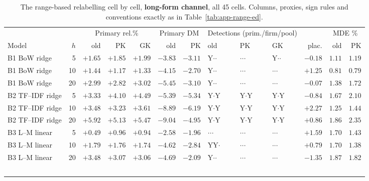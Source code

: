 \begin{table}[p]
\centering
\caption[The range-based relabelling, long-form cells]{The range-based
relabelling cell by cell, \textbf{long-form channel}, all 45 cells.
Columns, proxies, sign rules and conventions exactly as in
Table~\ref{tab:app-range-ed}.}
\label{tab:app-range-lf}
\singlespacing\footnotesize
\setlength{\tabcolsep}{3pt}
\begin{tabular}{@{}lrrrrrrlllrrr@{}}
\toprule
& & \multicolumn{3}{c}{Primary rel.\%} & \multicolumn{2}{c}{Primary DM} & \multicolumn{3}{c}{Detections (prim./firm/pool)} & & \multicolumn{2}{c}{MDE \%} \\
\cmidrule(lr){3-5}\cmidrule(lr){6-7}\cmidrule(lr){8-10}\cmidrule(lr){12-13}
Model & $h$ & old & PK & GK & old & PK & old & PK & GK & plac. & old & PK \\
\midrule
B1 BoW ridge & 5 & $+1.65$ & $+1.85$ & $+1.99$ & $-3.83$ & $-3.11$ & Y$\cdot$$\cdot$ & $\cdot$$\cdot$$\cdot$ & Y$\cdot$$\cdot$ & $-0.18$ & $1.11$ & $1.19$ \\
B1 BoW ridge & 10 & $+1.44$ & $+1.17$ & $+1.33$ & $-4.15$ & $-2.70$ & Y$\cdot$$\cdot$ & $\cdot$$\cdot$$\cdot$ & $\cdot$$\cdot$$\cdot$ & $+1.25$ & $0.81$ & $0.79$ \\
B1 BoW ridge & 20 & $+2.99$ & $+2.82$ & $+3.02$ & $-5.45$ & $-3.10$ & Y$\cdot$$\cdot$ & $\cdot$$\cdot$$\cdot$ & $\cdot$$\cdot$$\cdot$ & $-0.07$ & $1.38$ & $1.72$ \\
\addlinespace
B2 TF--IDF ridge & 5 & $+3.33$ & $+4.10$ & $+4.49$ & $-5.39$ & $-5.34$ & Y$\cdot$Y & Y$\cdot$Y & Y$\cdot$Y & $-0.84$ & $1.67$ & $2.10$ \\
B2 TF--IDF ridge & 10 & $+3.48$ & $+3.23$ & $+3.61$ & $-8.89$ & $-6.19$ & Y$\cdot$Y & Y$\cdot$Y & Y$\cdot$Y & $+2.27$ & $1.25$ & $1.44$ \\
B2 TF--IDF ridge & 20 & $+5.92$ & $+5.13$ & $+5.47$ & $-9.04$ & $-4.95$ & Y$\cdot$Y & Y$\cdot$Y & Y$\cdot$Y & $+0.86$ & $1.86$ & $2.35$ \\
\addlinespace
B3 L--M linear & 5 & $+0.49$ & $+0.96$ & $+0.94$ & $-2.58$ & $-1.96$ & $\cdot$$\cdot$$\cdot$ & $\cdot$$\cdot$$\cdot$ & $\cdot$$\cdot$$\cdot$ & $+1.59$ & $1.70$ & $1.43$ \\
B3 L--M linear & 10 & $+1.79$ & $+1.76$ & $+1.74$ & $-4.62$ & $-2.84$ & YY$\cdot$ & $\cdot$$\cdot$$\cdot$ & $\cdot$$\cdot$$\cdot$ & $+0.79$ & $1.70$ & $1.38$ \\
B3 L--M linear & 20 & $+3.48$ & $+3.07$ & $+3.06$ & $-4.69$ & $-2.09$ & Y$\cdot$$\cdot$ & $\cdot$$\cdot$$\cdot$ & $\cdot$$\cdot$$\cdot$ & $-1.35$ & $1.87$ & $1.82$ \\
$$
\end{tabular}
\end{table}
